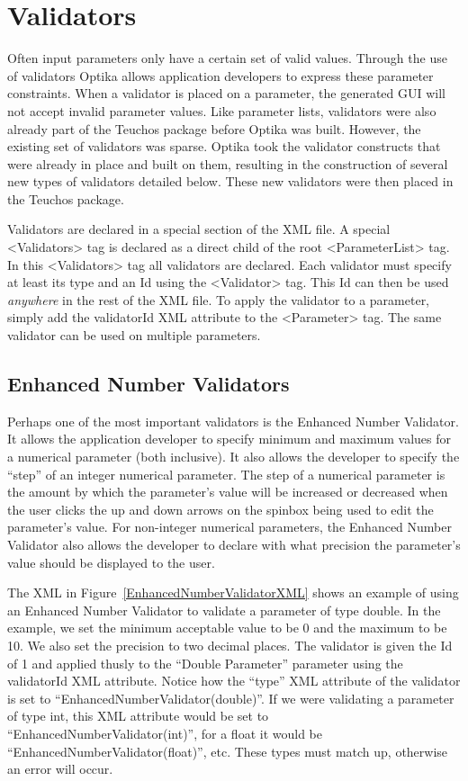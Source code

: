 \section{Validators}
Often input parameters only have a certain set of valid values. Through the use of validators Optika allows application
developers to express these parameter constraints. When a validator is placed on a parameter, the generated GUI will
not accept invalid parameter values. Like parameter lists, validators were also already part of the Teuchos package
before Optika was built. However, the existing set of validators was sparse. Optika took the validator constructs that
were already in place and built on them, resulting in the construction of several new types of validators detailed below.
These new validators were then placed in the Teuchos package.

Validators are declared in a special section of the XML file. A special <Validators> tag is declared as a direct child
of the root <ParameterList> tag. In this <Validators> tag all validators are declared. Each validator must specify at
least its type and an Id using the <Validator> tag. This Id can then be used \emph{anywhere} in the rest of the XML file. 
To apply the validator to a parameter, simply add the validatorId XML attribute to the <Parameter> tag. The same validator 
can be used on multiple parameters.

\subsection{Enhanced Number Validators}
Perhaps one of the most important validators is the Enhanced Number Validator. It allows the application developer
to specify minimum and maximum values for a numerical parameter (both inclusive). It also allows the developer to specify the
``step'' of an integer numerical parameter. The step of a numerical parameter is the amount by which the parameter's value
will be increased or decreased when the user clicks the up and down arrows on the spinbox being used to edit
the parameter's value. For non-integer numerical parameters, the Enhanced Number Validator also allows the
developer to declare with what precision the parameter's value should be displayed to the user.

The XML in Figure~\ref{EnhancedNumberValidatorXML} shows an example of using an Enhanced Number Validator
to validate a parameter of type double. In the example, we set the minimum acceptable value to be 0 and the 
maximum to be 10. We also set the precision to two decimal places.
The validator is given the Id of 1 and applied thusly to the ``Double Parameter'' parameter using the validatorId
XML attribute. Notice how the ``type'' XML attribute of the validator is set to ``EnhancedNumberValidator(double)''. If we 
were validating a parameter of type int, this XML attribute would be set to ``EnhancedNumberValidator(int)'', 
for a float it would be ``EnhancedNumberValidator(float)'', etc. These types must match up, otherwise an error will
occur.

